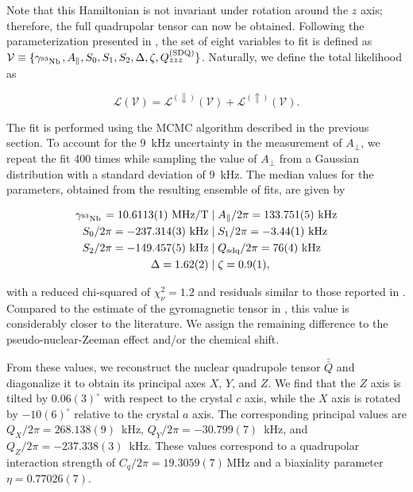Note that this Hamiltonian is not invariant under rotation around the $z$ axis; therefore, the full quadrupolar tensor can now be obtained. Following the parameterization presented in , the set of eight variables to fit is defined as $\mathcal{V}\equiv\{\gamma_{\text{$^{93}$Nb\,}}, A_\parallel, S_0,S_1,S_2,\Delta,\zeta,Q^{\text{(SDQ)}}_{zzz}\}$. Naturally, we define the total likelihood as

\begin{equation}
    \mathcal{L}(\mathcal{V}) = \mathcal{L}^{(\Downarrow)}(\mathcal{V}) + \mathcal{L}^{(\Uparrow)}(\mathcal{V}).
\end{equation}

The fit is performed using the MCMC algorithm described in the previous section. To account for the 9~kHz uncertainty in the measurement of $A_\perp$, we repeat the fit 400 times while sampling the value of $A_\perp$ from a Gaussian distribution with a standard deviation of 9~kHz. The median values for the parameters, obtained from the resulting ensemble of fits, are given by

\begin{align}
\label{seq:full_fit_results}
\begin{split}
    \gamma_{\text{$^{93}$Nb\,}} =  10.6113(1) \text{~MHz/T} \; &| \; A_\parallel/2\pi =  133.751(5)\text{~kHz} \\ 
    S_0/2\pi= -237.314(3)\text{~kHz} \; &| \; S_1/2\pi= -3.44(1) \text{~kHz} \\
    S_2/2\pi = -149.457(5)\text{~kHz}\; &| \;  Q_\mathrm{sdq}/2\pi= 76(4) \text{~kHz}\\
    \Delta = 1.62(2)\; &| \;\zeta = 0.9(1), \\
\end{split}
\end{align}

\noindent with a reduced chi-squared of $\chi^2_\nu=1.2$ and residuals similar to those reported in . Compared to the estimate of the gyromagnetic tensor in , this value is considerably closer to the literature. We assign the remaining difference to the pseudo-nuclear-Zeeman effect and/or the chemical shift.

From these values, we reconstruct the nuclear quadrupole tensor $\bar{\bar{Q}}$ and diagonalize it to obtain its principal axes $X$, $Y$, and $Z$. We find that the $Z$ axis is tilted by $0.06(3)^\circ$ with respect to the crystal $c$ axis, while the $X$ axis is rotated by $-10(6)^\circ$ relative to the crystal $a$ axis. The corresponding principal values are $Q_X/2\pi = 268.138(9)$~kHz, $Q_Y/2\pi = -30.799(7)$~kHz, and $Q_Z/2\pi = -237.338(3)$~kHz. These values correspond to a quadrupolar interaction strength of $C_q / 2\pi = 19.3059(7)\,\mathrm{MHz}$ and a biaxiality parameter $\eta = 0.77026(7)$.

